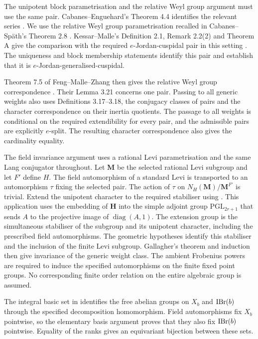 The unipotent block parametrisation and the relative Weyl group argument
must use the same pair. Cabanes--Enguehard's Theorem 4.4 identifies
the relevant series \cite{CabanesEnguehard1994}. We use the relative Weyl
group parametrisation recalled in Cabanes--Sp\"ath's Theorem 2.8
\cite{CabanesSpath2013}. Kessar--Malle's Definition 2.1, Remark 2.2(2) and
Theorem A give the comparison with the required $e$-Jordan-cuspidal pair in
this setting \cite{KessarMalle2015}. The uniqueness and block membership
statements identify this pair and establish that it is
$e$-Jordan-generalised-cuspidal.

Theorem 7.5 of Feng--Malle--Zhang then gives the relative Weyl group
correspondence \cite{FengMalleZhang2026}. Their Lemma 3.21 concerns one
pair. Passing to all generic weights also uses Definitions 3.17--3.18, the
conjugacy classes of pairs and the character correspondence on their
inertia quotients. The passage to all weights is conditional on the
required extendibility for every pair, and the admissible pairs are
explicitly $e$-split. The resulting character correspondence also gives the
cardinality equality.

The field invariance argument uses a rational Levi parametrisation and the
same Lang conjugator throughout. Let $\mathbf M$ be the selected rational
Levi subgroup and let $F'$ define $H$. The field automorphism of a standard
Levi is transported to an automorphism $\tau$ fixing the selected pair. The
action of $\tau$ on $N_H(\mathbf M)/\mathbf M^{F'}$ is trivial. Extend the
unipotent character to the required stabiliser using
\cite[Theorem~3.3]{Spath2025Extensions}. This application uses the embedding of $\mathbf H$ into the simple adjoint group $\mathrm{PGL}_{2r+1}$ that sends $A$ to the projective image of $\operatorname{diag}(A,1)$. The extension group is
the simultaneous stabiliser of the subgroup and its unipotent character,
including the prescribed field automorphisms. The geometric hypotheses
identify this stabiliser and the inclusion of the finite Levi subgroup.
Gallagher's theorem and induction then give invariance of the generic weight
class. The ambient Frobenius powers are required to induce the specified
automorphisms on the finite fixed point groups. No corresponding finite
order relation on the entire algebraic group is assumed.

The integral basic set in \cite[Theorem~A]{Geck1993} identifies the free
abelian groups on $X_b$ and $\operatorname{IBr}(b)$ through the specified decomposition
homomorphism. Field automorphisms fix $X_b$ pointwise, so the elementary
basis argument proves that they also fix $\operatorname{IBr}(b)$ pointwise. Equality of
the ranks gives an equivariant bijection between these sets.

